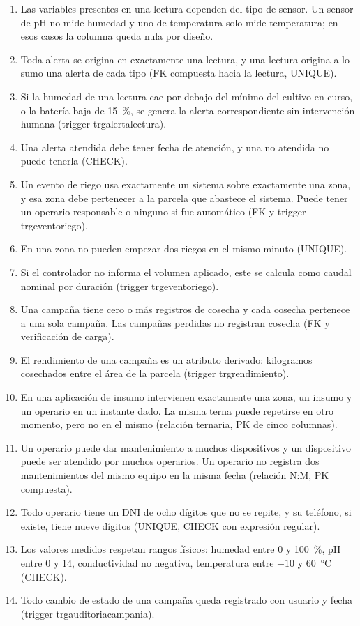 \documentclass[11pt,letterpaper]{article}
\newcommand{\tbus}{\textunderscore\allowbreak}
\newcommand{\tb}[1]{{\ttfamily\let\_\tbus #1}}
\begin{document}
\begin{enumerate}[label=\textbf{R\arabic*.},leftmargin=2.3em,itemsep=0.15em]
\item Las variables presentes en una lectura dependen del tipo de sensor. Un sensor de pH no mide humedad y uno de temperatura solo mide temperatura; en esos casos la columna queda nula por diseño.
\item Toda alerta se origina en exactamente una lectura, y una lectura origina a lo sumo una alerta de cada tipo (FK compuesta hacia la lectura, \tb{UNIQUE}).
\item Si la humedad de una lectura cae por debajo del mínimo del cultivo en curso, o la batería baja de 15~\%, se genera la alerta correspondiente sin intervención humana (trigger \tb{trg\_alerta\_lectura}).
\item Una alerta atendida debe tener fecha de atención, y una no atendida no puede tenerla (\tb{CHECK}).
\item Un evento de riego usa exactamente un sistema sobre exactamente una zona, y esa zona debe pertenecer a la parcela que abastece el sistema. Puede tener un operario responsable o ninguno si fue automático (FK y trigger \tb{trg\_evento\_riego}).
\item En una zona no pueden empezar dos riegos en el mismo minuto (\tb{UNIQUE}).
\item Si el controlador no informa el volumen aplicado, este se calcula como caudal nominal por duración (trigger \tb{trg\_evento\_riego}).
\item Una campaña tiene cero o más registros de cosecha y cada cosecha pertenece a una sola campaña. Las campañas perdidas no registran cosecha (FK y verificación de carga).
\item El rendimiento de una campaña es un atributo derivado: kilogramos cosechados entre el área de la parcela (trigger \tb{trg\_rendimiento}).
\item En una aplicación de insumo intervienen exactamente una zona, un insumo y un operario en un instante dado. La misma terna puede repetirse en otro momento, pero no en el mismo (relación ternaria, PK de cinco columnas).
\item Un operario puede dar mantenimiento a muchos dispositivos y un dispositivo puede ser atendido por muchos operarios. Un operario no registra dos mantenimientos del mismo equipo en la misma fecha (relación N:M, PK compuesta).
\item Todo operario tiene un DNI de ocho dígitos que no se repite, y su teléfono, si existe, tiene nueve dígitos (\tb{UNIQUE}, \tb{CHECK} con expresión regular).
\item Los valores medidos respetan rangos físicos: humedad entre 0 y 100~\%, pH entre 0 y 14, conductividad no negativa, temperatura entre $-10$ y 60~°C (\tb{CHECK}).
\item Todo cambio de estado de una campaña queda registrado con usuario y fecha (trigger \tb{trg\_auditoria\_campania}).
\end{enumerate}
\end{document}
